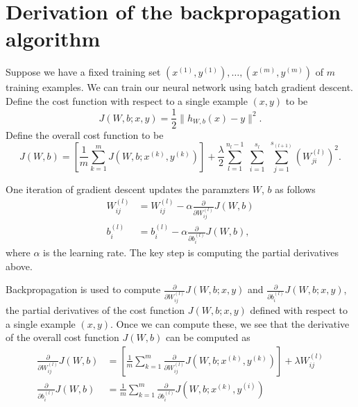 \documentclass{article}
\begin{document}
\section{Derivation of the backpropagation algorithm}

Suppose we have a fixed training set $(x^{(1)}, y^{(1)}), \dots, (x^{(m)}, y^{(m)})$ of $m$ training examples. We can train our neural network using batch gradient descent. Define the cost function with respect to a single example $(x,y)$ to be
\begin{equation}
J(W,b;x,y) = \frac{1}{2} \|h_{W,b}(x)-y\|^2.
\label{eq:costsingle}
\end{equation}
%
Define the overall cost function to be
\begin{equation}
J(W,b) = \left[ \frac{1}{m} \sum_{k=1}^m J(W,b;x^{(k)},y^{(k)}) \right] + \frac{\lambda}{2} \sum_{l=1}^{n_l-1} \; \sum_{i=1}^{s_l} \; \sum_{j=1}^{s_{(l+1)}} \left( W^{(l)}_{ji} \right)^2.
\end{equation}

One iteration of gradient descent updates the paramzters $W$, $b$ as follows
\begin{align}
W_{ij}^{(l)} & = W_{ij}^{(l)} - \alpha \frac{\partial}{\partial W_{ij}^{(l)}} J(W,b) \\
b_{i}^{(l)} & = b_{i}^{(l)} - \alpha \frac{\partial}{\partial b_{i}^{(l)}} J(W,b),
\end{align}
where $\alpha$ is the learning rate. The key step is computing the partial derivatives above.

Backpropagation is used to compute $\frac{\partial}{\partial W_{ij}^{(l)}} J(W,b; x, y)$ and $\frac{\partial}{\partial b_{i}^{(l)}} J(W,b; x, y)$, the partial derivatives of the cost function $J(W,b;x,y)$ defined with respect to a single example $(x,y)$. Once we can compute these, we see that the derivative of the overall cost function $J(W,b)$ can be computed as
\begin{align}
\frac{\partial}{\partial W_{ij}^{(l)}} J(W,b) & =
\left[ \frac{1}{m} \sum_{k=1}^m \frac{\partial}{\partial W_{ij}^{(l)}} J(W,b; x^{(k)}, y^{(k)}) \right] + \lambda W_{ij}^{(l)} \\
\frac{\partial}{\partial b_{i}^{(l)}} J(W,b) & =
\frac{1}{m}\sum_{k=1}^m \frac{\partial}{\partial b_{i}^{(l)}} J(W,b; x^{(k)}, y^{(i)})
\end{align}
\end{document}
